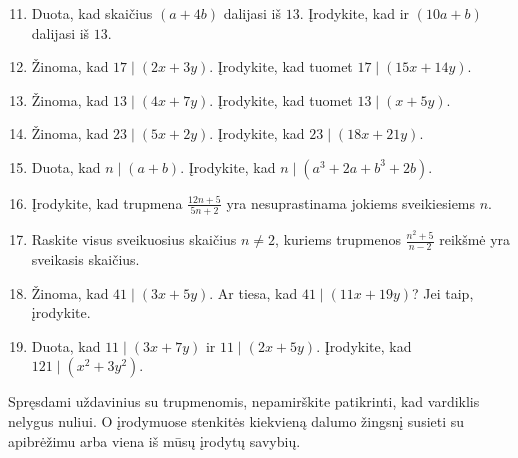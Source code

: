 \documentclass[11pt,a4paper]{scrartcl}
\begin{document}
\begin{enumerate}
    \setcounter{enumi}{10}
    \item Duota, kad skaičius \((a+4b)\) dalijasi iš $13$. Įrodykite, kad ir \((10a+b)\) dalijasi iš $13$.
    \item Žinoma, kad \(17 \mid (2x + 3y)\). Įrodykite, kad tuomet \(17 \mid (15x + 14y)\).
    \item Žinoma, kad \(13 \mid (4x + 7y)\). Įrodykite, kad tuomet \(13 \mid (x + 5y)\).
    \item Žinoma, kad \(23 \mid (5x + 2y)\). Įrodykite, kad \(23 \mid (18x + 21y)\). 
    \item Duota, kad \(n \mid (a+b)\). Įrodykite, kad \(n \mid (a^3+2a+b^3+2b)\).
    \item Įrodykite, kad trupmena \(\frac{12n + 5}{5n + 2}\) yra nesuprastinama jokiems sveikiesiems \(n\).
    \item Raskite visus sveikuosius skaičius \(n\ne2\), kuriems trupmenos \(\frac{n^2 + 5}{n - 2}\) reikšmė yra sveikasis skaičius.
    \item Žinoma, kad \(41 \mid (3x + 5y)\). Ar tiesa, kad \(41 \mid (11x + 19y)\)? Jei taip, įrodykite.
    \item Duota, kad \(11 \mid (3x+7y)\) ir \(11 \mid (2x+5y)\). Įrodykite, kad \(121 \mid (x^2+3y^2)\).
\end{enumerate}

\begin{remark*}
Spręsdami uždavinius su trupmenomis, nepamirškite patikrinti, kad vardiklis nelygus nuliui. O įrodymuose stenkitės kiekvieną dalumo žingsnį susieti su apibrėžimu arba viena iš mūsų įrodytų savybių.
\end{remark*}
\end{document}
